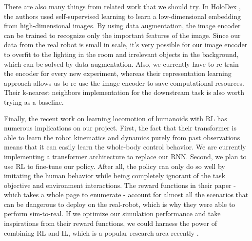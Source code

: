 There are also many things from related work that we should try. In HoloDex \cite{arunachalam2022holodex}, the authors used self-supervised learning to learn a low-dimensional embedding from high-dimensional images. By using data augmentation, the image encoder can be trained to recognize only the important features of the image. Since our data from the real robot is small in scale, it's very possible for our image encoder to overfit to the lighting in the room and irrelevant objects in the background, which can be solved by data augmentation. Also, we currently have to re-train the encoder for every new experiment, whereas their representation learning approach allows us to re-use the image encoder to save computational resources.
Their k-nearest neighbors implementation for the downstream task is also worth trying as a baseline.

Finally, the recent work on learning locomotion of humanoids \cite{radosavovic2023learning} with RL has numerous implications on our project. First, the fact that their transformer is able to learn the robot kinematics and dynamics purely from past observations means that it can easily learn the whole-body control behavior. We are currently implementing a transformer architecture to replace our RNN. 
Second, we plan to use RL to fine-tune our policy. After all, the policy can only do so well by imitating the human behavior while being completely ignorant of the task objective and environment interactions. The reward functions in their paper - which takes a whole page to enumerate - account for almost all the scenarios that can be dangerous to deploy on the real-robot, which is why they were able to perform sim-to-real. If we optimize our simulation performance and take inspirations from their reward functions, we could harness the power of combining RL and IL, which is a popular research area recently \cite{wang2023dshape}.
